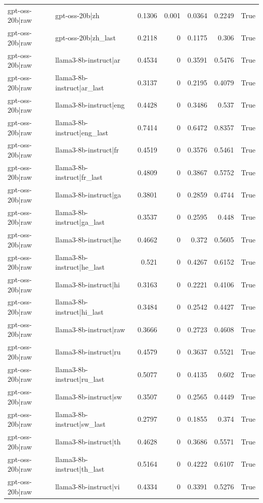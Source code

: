 \begin{table}
\begin{tabular}{l l r r r r l}
gpt-oss-20b|raw & gpt-oss-20b|zh & 0.1306 & 0.001 & 0.0364 & 0.2249 & True \\
gpt-oss-20b|raw & gpt-oss-20b|zh_last & 0.2118 & 0 & 0.1175 & 0.306 & True \\
gpt-oss-20b|raw & llama3-8b-instruct|ar & 0.4534 & 0 & 0.3591 & 0.5476 & True \\
gpt-oss-20b|raw & llama3-8b-instruct|ar_last & 0.3137 & 0 & 0.2195 & 0.4079 & True \\
gpt-oss-20b|raw & llama3-8b-instruct|eng & 0.4428 & 0 & 0.3486 & 0.537 & True \\
gpt-oss-20b|raw & llama3-8b-instruct|eng_last & 0.7414 & 0 & 0.6472 & 0.8357 & True \\
gpt-oss-20b|raw & llama3-8b-instruct|fr & 0.4519 & 0 & 0.3576 & 0.5461 & True \\
gpt-oss-20b|raw & llama3-8b-instruct|fr_last & 0.4809 & 0 & 0.3867 & 0.5752 & True \\
gpt-oss-20b|raw & llama3-8b-instruct|ga & 0.3801 & 0 & 0.2859 & 0.4744 & True \\
gpt-oss-20b|raw & llama3-8b-instruct|ga_last & 0.3537 & 0 & 0.2595 & 0.448 & True \\
gpt-oss-20b|raw & llama3-8b-instruct|he & 0.4662 & 0 & 0.372 & 0.5605 & True \\
gpt-oss-20b|raw & llama3-8b-instruct|he_last & 0.521 & 0 & 0.4267 & 0.6152 & True \\
gpt-oss-20b|raw & llama3-8b-instruct|hi & 0.3163 & 0 & 0.2221 & 0.4106 & True \\
gpt-oss-20b|raw & llama3-8b-instruct|hi_last & 0.3484 & 0 & 0.2542 & 0.4427 & True \\
gpt-oss-20b|raw & llama3-8b-instruct|raw & 0.3666 & 0 & 0.2723 & 0.4608 & True \\
gpt-oss-20b|raw & llama3-8b-instruct|ru & 0.4579 & 0 & 0.3637 & 0.5521 & True \\
gpt-oss-20b|raw & llama3-8b-instruct|ru_last & 0.5077 & 0 & 0.4135 & 0.602 & True \\
gpt-oss-20b|raw & llama3-8b-instruct|sw & 0.3507 & 0 & 0.2565 & 0.4449 & True \\
gpt-oss-20b|raw & llama3-8b-instruct|sw_last & 0.2797 & 0 & 0.1855 & 0.374 & True \\
gpt-oss-20b|raw & llama3-8b-instruct|th & 0.4628 & 0 & 0.3686 & 0.5571 & True \\
gpt-oss-20b|raw & llama3-8b-instruct|th_last & 0.5164 & 0 & 0.4222 & 0.6107 & True \\
gpt-oss-20b|raw & llama3-8b-instruct|vi & 0.4334 & 0 & 0.3391 & 0.5276 & True \\

\end{tabular}
\end{table}
